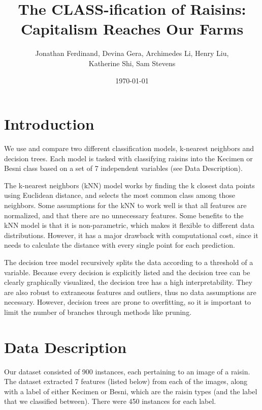\documentclass{article}
\title{The CLASS-ification of Raisins: Capitalism Reaches Our Farms}
\author{Jonathan Ferdinand, Devina Gera, Archimedes Li, Henry Liu, \\Katherine Shi, Sam Stevens}
\date{\today}
\begin{document}
\maketitle

\section{Introduction}

We use and compare two different classification models, k-nearest neighbors and decision trees.  Each model is tasked with classifying raisins into the Kecimen or Besni class based on a set of 7 independent variables (see Data Description).

The k-nearest neighbors (kNN) model works by finding the k closest data points using Euclidean distance, and selects the most common class among those neighbors.  Some assumptions for the kNN to work well is that all features are normalized, and that there are no unnecessary features.  Some benefits to the kNN model is that it is non-parametric, which makes it flexible to different data distributions.  However, it has a major drawback with computational cost, since it needs to calculate the distance with every single point for each prediction.

The decision tree model recursively splits the data according to a threshold of a variable.  Because every decision is explicitly listed and the decision tree can be clearly graphically visualized, the decision tree has a high interpretability.  They are also robust to extraneous features and outliers, thus no data assumptions are necessary.  However, decision trees are prone to overfitting, so it is important to limit the number of branches through methods like pruning.


\section{Data Description}
Our dataset consisted of 900 instances, each pertaining to an image of a raisin. The dataset extracted 7 features (listed below) from each of the images, along with a label of either Kecimen or Besni, which are the raisin types (and the label that we classified between). There were 450 instances for each label.
\end{document}

